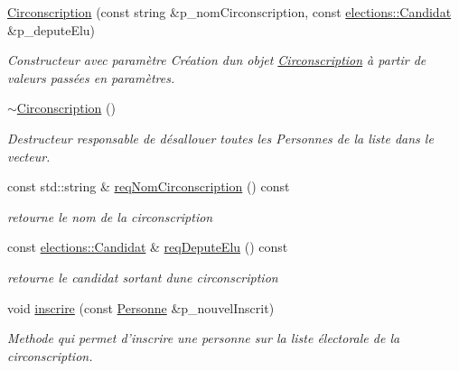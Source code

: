 \begin{DoxyCompactItemize}
\item 
\hyperlink{classelections_1_1Circonscription_a73b7ff6d629d356fc9a38337848d5e00}{Circonscription} (const string \&p\+\_\+nom\+Circonscription, const \hyperlink{classelections_1_1Candidat}{elections\+::\+Candidat} \&p\+\_\+depute\+Elu)
\begin{DoxyCompactList}\small\item\em Constructeur avec paramètre Création d\textquotesingle{}un objet \hyperlink{classelections_1_1Circonscription}{Circonscription} à partir de valeurs passées en paramètres. \end{DoxyCompactList}\item 
\mbox{\label{classelections_1_1Circonscription_abc80c8b4c096dfc36a55cc0e7b8d3a8c}} 
\hyperlink{classelections_1_1Circonscription_abc80c8b4c096dfc36a55cc0e7b8d3a8c}{$\sim$\+Circonscription} ()
\begin{DoxyCompactList}\small\item\em Destructeur responsable de désallouer toutes les Personnes de la liste dans le vecteur. \end{DoxyCompactList}\item 
const std\+::string \& \hyperlink{classelections_1_1Circonscription_adbacabf731fe2afccc919b8bd8c4eae8}{req\+Nom\+Circonscription} () const
\begin{DoxyCompactList}\small\item\em retourne le nom de la circonscription \end{DoxyCompactList}\item 
const \hyperlink{classelections_1_1Candidat}{elections\+::\+Candidat} \& \hyperlink{classelections_1_1Circonscription_a162a8ccd10bbfe3297489e19e924f3d1}{req\+Depute\+Elu} () const
\begin{DoxyCompactList}\small\item\em retourne le candidat sortant d\textquotesingle{}une circonscription \end{DoxyCompactList}\item 
void \hyperlink{classelections_1_1Circonscription_a808d1495bfb8dda4bb75114d3387d35b}{inscrire} (const \hyperlink{classelections_1_1Personne}{Personne} \&p\+\_\+nouvel\+Inscrit)
\begin{DoxyCompactList}\small\item\em Methode qui permet d’inscrire une personne sur la liste électorale de la circonscription. \end{DoxyCompactList}\item 

\end{DoxyCompactItemize}
